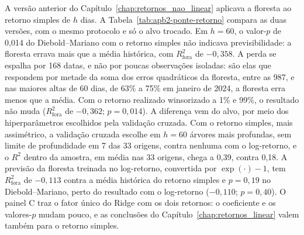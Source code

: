 A versão anterior do Capítulo~\ref{chap:retornos_nao_linear} aplicava a
floresta ao retorno simples de $h$ dias. A
Tabela~\ref{tab:apb2-ponte-retorno} compara as duas versões, com o mesmo
protocolo e só o alvo trocado. Em $h = 60$, o valor-$p$ de 0,014 do
Diebold--Mariano com o retorno simples não indicava previsibilidade: a
floresta errava mais que a média histórica, com $R^2_{\text{fora}}$ de
$-0{,}358$. A perda se espalha por 168 datas, e não por poucas observações
isoladas: são elas que respondem por metade da soma dos erros quadráticos da
floresta, entre as 987, e nas maiores altas de 60 dias, de 63\% a 75\% em
janeiro de 2024, a floresta erra menos que a média. Com o retorno realizado
winsorizado a 1\% e 99\%, o resultado não muda ($R^2_{\text{fora}}$ de
$-0{,}362$; $p = 0{,}014$). A diferença vem do alvo, por meio dos
hiperparâmetros escolhidos pela validação cruzada. Com o retorno simples,
mais assimétrico, a validação cruzada escolhe em $h = 60$ árvores mais
profundas, sem limite de profundidade em 7 das 33 origens, contra nenhuma com
o log-retorno, e o $R^2$ dentro da amostra, em média nas 33 origens, chega a
0,39, contra 0,18. A previsão da floresta treinada no log-retorno, convertida
por $\exp(\cdot) - 1$, tem $R^2_{\text{fora}}$ de $-0{,}113$ contra a média
histórica do retorno simples e $p = 0{,}19$ no Diebold--Mariano, perto do
resultado com o log-retorno ($-0{,}110$; $p = 0{,}40$). O painel C traz o fator
único do Ridge com os dois retornos: o coeficiente e os valores-$p$ mudam
pouco, e as conclusões do Capítulo~\ref{chap:retornos_linear} valem também
para o retorno simples.


